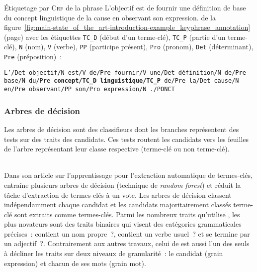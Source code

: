         \begin{example}\label{ex:crf_tagging}
          Étiquetage par \textsc{Crf} de la phrase \og{}L'objectif est de
          fournir une définition de base du concept linguistique de la cause en
          observant son expression.\fg{} de la
          figure~\ref{fig:main-state_of_the_art-introduction-example_keyphrase_annotation}
          (page\pageref{fig:main-state_of_the_art-introduction-example_keyphrase_annotation})
          avec les étiquettes \texttt{TC\_D} (début d'un terme-clé),
          \texttt{TC\_P} (partie d'un terme-clé), \texttt{N} (nom), \texttt{V}
          (verbe), \texttt{PP} (participe présent), \texttt{Pro} (pronom),
          \texttt{Det} (déterminant), \texttt{Pre} (préposition)~:\\
          \begin{center}\vspace{-1em}
            \parbox{.8\linewidth}{
              \texttt{L'/Det objectif/N est/V de/Pre fournir/V une/Det
              définition/N de/Pre base/N du/Pre \textbf{concept/TC\_D
              linguistique/TC\_P} de/Pre la/Det cause/N en/Pre observant/PP
              son/Pro expression/N ./PONCT}
            }
          \end{center}\vspace{.25em}
        \end{example}

      \subsubsection{Arbres de décision}
      \label{subsubsec:main-state_of_the_art-automatic_keyphrase_extraction-supervised_keyphrase_extraction-decision_trees}
        Les arbres de décision sont des classifieurs dont les branches
        représentent des tests sur des traits des candidats. Ces tests routent
        les candidats vers les feuilles de l'arbre représentant leur classe
        respective (\og{}terme-clé\fg{} ou \og{}non terme-clé\fg{}).

        ~\\Dans son article sur l'apprentissage pour l'extraction automatique de
        termes-clés,  entraîne plusieurs
        arbres de décision (technique de \textit{random forest}) et réduit la
        tâche d'extraction de termes-clés à un vote. Les arbres de décision
        classent indépendamment chaque candidat et les candidats majoritairement
        classés \og{}terme-clé\fg{} sont extraits comme termes-clés. Parmi les
        nombreux traits qu'utilise , les
        plus novateurs sont des traits binaires qui visent des catégories
        grammaticales précises~: \og{}contient un nom propre~?\fg{},
        \og{}contient un verbe usuel~?\fg{} et \og{}se termine par un
        adjectif~?\fg{}. Contrairement aux autres travaux, celui de
         est aussi l'un des seuls à
        décliner les traits sur deux niveaux de granularité~: le candidat (grain
        expression) et chacun de ses mots (grain mot).

